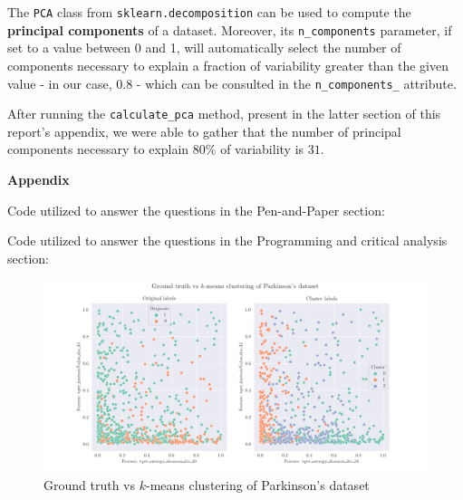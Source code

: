 \documentclass[12pt]{article}
\begin{document}
\begin{enumerate}[leftmargin=\labelsep,resume]
        The \texttt{PCA} class from \texttt{sklearn.decomposition} can be used to
        compute the \textbf{principal components} of a dataset. Moreover, its
        \texttt{n\_components} parameter, if set to a value between 0 and 1, will
        automatically select the number of components necessary to explain a fraction
        of variability greater than the given value - in our case, 0.8 - which can
        be consulted in the \texttt{n\_components\_} attribute.

        After running the \texttt{calculate\_pca} method, present in the latter
        section of this report's appendix, we were able to gather that the
        number of principal components necessary to explain 80\% of variability
        is $31$.

\end{enumerate}

\pagebreak

\large{\textbf{Appendix}\vskip 0.3cm}

Code utilized to answer the questions in the Pen-and-Paper section:



Code utilized to answer the questions in the Programming and critical analysis section:



\begin{figure}[H]
  \centering
  \includegraphics[width=\textwidth]{../assets/parkinsons.png}
  \caption{Ground truth vs $k$-means clustering of Parkinson's dataset}
  \label{fig:diagnoses-plots}
\end{figure}
\end{document}
